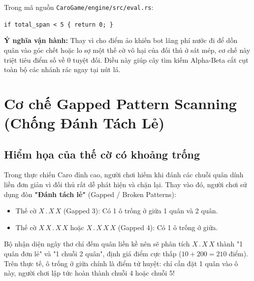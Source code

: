 \documentclass[11pt,a4paper]{report}
\begin{document}
\begin{tcolorbox}[title={\textbf{Cơ chế thực thi: Triệt tiêu điểm rác về 0}}]
Trong mã nguồn \texttt{CaroGame/engine/src/eval.rs}:
\begin{center}
\texttt{if total\_span < 5 \{ return 0; \}}
\end{center}
\textbf{Ý nghĩa vận hành:} Thay vì cho điểm ảo khiến bot lãng phí nước đi để dồn quân vào góc chết hoặc lo sợ một thế cờ vô hại của đối thủ ở sát mép, cơ chế này triệt tiêu điểm số về 0 tuyệt đối. Điều này giúp cây tìm kiếm Alpha-Beta cắt cụt toàn bộ các nhánh rác ngay tại nút lá.
\end{tcolorbox}

\section{Cơ chế Gapped Pattern Scanning (Chống Đánh Tách Lẻ)}

\subsection{Hiểm họa của thế cờ có khoảng trống}
Trong thực chiến Caro đỉnh cao, người chơi hiếm khi đánh các chuỗi quân dính liền đơn giản vì đối thủ rất dễ phát hiện và chặn lại. Thay vào đó, người chơi sử dụng đòn \textbf{"Đánh tách lẻ"} (Gapped / Broken Patterns):
\begin{itemize}
    \item Thế cờ $X \, . \, X \, X$ (Gapped 3): Có 1 ô trống ở giữa 1 quân và 2 quân.
    \item Thế cờ $X \, X \, . \, X \, X$ hoặc $X \, . \, X \, X \, X$ (Gapped 4): Có 1 ô trống ở giữa.
\end{itemize}
Bộ nhận diện ngây thơ chỉ đếm quân liền kề nên sẽ phân tích $X \, . \, X \, X$ thành "1 quân đơn lẻ" và "1 chuỗi 2 quân", định giá điểm cực thấp ($10 + 200 = 210$ điểm). Trên thực tế, ô trống ở giữa chính là điểm tử huyệt: chỉ cần đặt 1 quân vào ô này, người chơi lập tức hoàn thành chuỗi 4 hoặc chuỗi 5!
\end{document}
